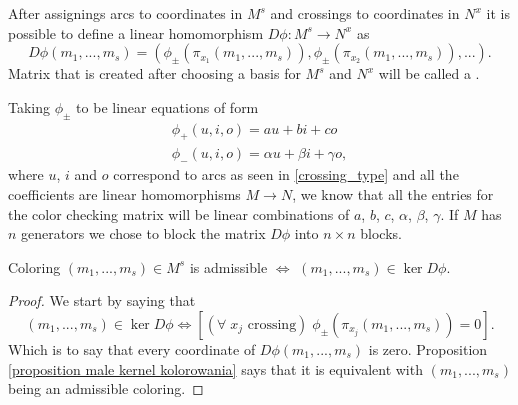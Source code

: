 \begin{definition}\label{def:color checking matrix}
  After assignings arcs to coordinates in $M^s$ and crossings to coordinates in $N^x$ it is possible to define a linear homomorphism $D\phi:M^s\to N^x$  as
  $$D\phi(m_1,...,m_s)=(\phi_\pm(\pi_{x_1}(m_1,...,m_s)), \phi_\pm(\pi_{x_2}(m_1,...,m_s)),...).$$
  Matrix that is created after choosing a basis for $M^s$ and $N^x$ will be called a .
\end{definition}

Taking $\phi_\pm$ to be linear equations of form
\begin{align}\label{phi equations1}
\phi_+(u,i,o)=au+bi+co \\ 
\phi_-(u,i,o)=\alpha u+\beta i+\gamma o, \label{phi equations2}
\end{align}
where $u$, $i$ and $o$ correspond to arcs as seen in \cref{crossing_type} and all the coefficients are linear homomorphisms $M\to N$, we know that all the entries for the color checking matrix will be linear combinations of $a$, $b$, $c$, $\alpha$, $\beta$, $\gamma$. If $M$ has $n$ generators we chose to block the matrix $D\phi$ into $n\times n$ blocks.

\begin{proposition}
  Coloring $(m_1,...,m_s)\in M^s$ is admissible $\iff$ $(m_1,...,m_s)\in\ker D\phi$.
\end{proposition}

\begin{proof}
  We start by saying that 
  $$(m_1,..., m_s)\in\ker D\phi\iff [(\forall\;x_j\text{ crossing})\;\phi_\pm(\pi_{x_j}(m_1,..., m_s))=0].$$
  Which is to say that every coordinate of $D\phi(m_1,..., m_s)$ is zero. Proposition \cref{proposition male kernel kolorowania} says that it is equivalent with $(m_1,..., m_s)$ being an admissible coloring.
\end{proof}

